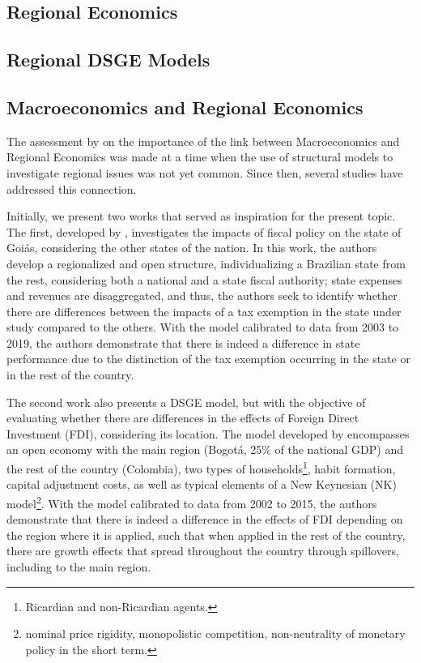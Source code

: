 \documentclass[../thesis.tex]{subfiles}
\begin{document}
	\subsection*{Regional Economics}
	
	\subsection*{Regional DSGE Models}
		
	\subsection*{Macroeconomics and Regional Economics}
	
	The assessment by \textcite{rickman_modern_2010} on the importance of the link between Macroeconomics and Regional Economics was made at a time when the use of structural models to investigate regional issues was not yet common. Since then, several studies have addressed this connection.
	
	Initially, we present two works that served as inspiration for the present topic. The first, developed by \textcite{costa_junior_dsge_2022}, investigates the impacts of fiscal policy on the state of Goiás, considering the other states of the nation. In this work, the authors develop a regionalized and open structure, individualizing a Brazilian state from the rest, considering both a national and a state fiscal authority; state expenses and revenues are disaggregated, and thus, the authors seek to identify whether there are differences between the impacts of a tax exemption in the state under study compared to the others. With the model calibrated to data from 2003 to 2019, the authors demonstrate that there is indeed a difference in state performance due to the distinction of the tax exemption occurring in the state or in the rest of the country.
	
	The second work also presents a DSGE model, but with the objective of evaluating whether there are differences in the effects of Foreign Direct Investment (FDI), considering its location. The model developed by \textcite{mora_fdi_2019} encompasses an open economy with the main region (Bogotá, 25\% of the national GDP) and the rest of the country (Colombia), two types of households\footnote{ Ricardian and non-Ricardian agents.}, habit formation, capital adjustment costs, as well as typical elements of a New Keynesian (NK) model\footnote{ nominal price rigidity, monopolistic competition, non-neutrality of monetary policy in the short term.}. With the model calibrated to data from 2002 to 2015, the authors demonstrate that there is indeed a difference in the effects of FDI depending on the region where it is applied, such that when applied in the rest of the country, there are growth effects that spread throughout the country through spillovers, including to the main region.
	
\end{document}
